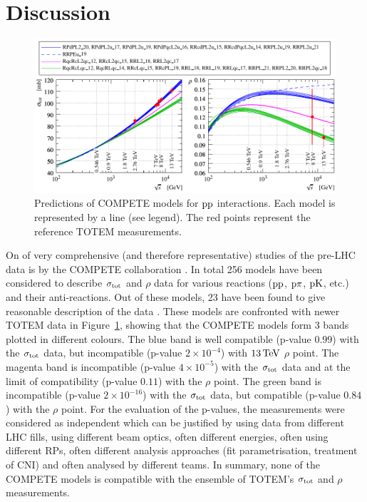 \section{Discussion}
\label{sec:discussion}

\begin{figure}
\vskip-5mm
\begin{center}
\includegraphics{fig/compete_bands_si_tot_rho.pdf}
\caption{%
Predictions of COMPETE models \cite{compete-details} for $\rm pp$ interactions. Each model is represented by a line (see legend). The red points represent the reference TOTEM measurements. 
}
\label{fig:comp bands}
\end{center}
\end{figure}

On of very comprehensive (and therefore representative) studies of the pre-LHC data is by the COMPETE collaboration \cite{compete}. In total 256 models have been considered to describe $\sigma_{\rm tot}$ and $\rho$ data for various reactions ($\rm pp$, $\rm p\pi$, $\rm pK$, etc.) and their anti-reactions. Out of these models, 23 have been found to give reasonable description of the data \cite{compete-details}. These models are confronted with newer TOTEM data in Figure~\ref{fig:comp bands}, showing that the COMPETE models form 3 bands plotted in different colours. The blue band is well compatible (p-value $0.99$) with the $\sigma_{\rm tot}$ data, but incompatible (p-value $2\times10^{-4}$) with $13\,{\rm TeV}$ $\rho$ point. The magenta band is incompatible (p-value $4\times10^{-5}$) with the $\sigma_{\rm tot}$ data and at the limit of compatibility (p-value $0.11$) with the $\rho$ point. The green band is incompatible (p-value $2\times10^{-16}$) with the $\sigma_{\rm tot}$ data, but compatible (p-value $0.84$) with the $\rho$ point. For the evaluation of the p-values, the measurements were considered as independent which can be justified by using data from different LHC fills, using different beam optics, often different energies, often using different RPs, often different analysis approaches (fit parametrisation, treatment of CNI) and often analysed by different teams. In summary, none of the COMPETE models is compatible with the ensemble of TOTEM's $\sigma_{\rm tot}$ and $\rho$ measurements.

